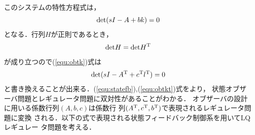 \documentclass[a4paper,12pt]{jarticle}
\begin{document}
%
このシステムの特性方程式は，
\begin{equation}\label{equ:statefb}
 {\rm{det}} (sI-A+bk)=0
\end{equation}
となる．行列$H$が正則であるとき，
\begin{equation}
 {\rm{det}} H = {\rm{det}} H^{\rm{T}}
\end{equation}
が成り立つので(\ref{equ:obtk})式は
\begin{equation}\label{equ:obtkt}
  {\rm{det}} (sI-A^{\rm{T}}+c^{\rm{T}}l^{\rm{T}})=0
\end{equation}
と書き換えることが出来る．(\ref{equ:statefb}),(\ref{equ:obtkt})式をより，
状態オブザーバ問題とレギュレータ問題に双対性があることがわかる．
オブザーバの設計に用いる係数行列$(A,b,c)$は係数行
列$(A^{\rm{T}},c^{\rm{T}},b^{\rm{T}})$で表現されるレギュレータ問題に変換
される．以下の式で表現される状態フィードバック制御系を用いてLQレギュレー
タ問題を考える．
\end{document}
